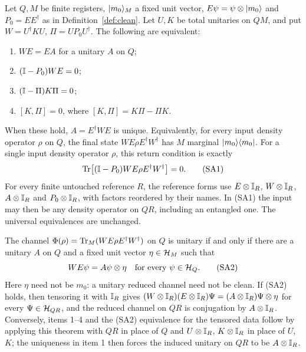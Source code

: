 \begin{theorem}\label{thm:sA-clean}
Let $Q,M$ be finite registers, $\lvert m_0\rangle_M$ a fixed unit vector,
$E\psi=\psi\otimes\lvert m_0\rangle$ and $P_0=EE^\dagger$ as in
Definition~\ref{def:clean}. Let $U,K$ be total unitaries on $QM$, and
put $W=U^\dagger KU$, $\Pi=UP_0U^\dagger$. The following are equivalent:
\begin{enumerate}
 \item $WE=EA$ for a unitary $A$ on $Q$;
 \item $(\mathbb{I}-P_0)WE=0$;
 \item $(\mathbb{I}-\Pi)K\Pi=0$;
 \item $[K,\Pi]=0$, where $[K,\Pi]=K\Pi-\Pi K$.
\end{enumerate}
When these hold, $A=E^\dagger WE$ is unique. Equivalently, for every
input density operator $\rho$ on $Q$, the final state
$WE\rho E^\dagger W^\dagger$ has $M$ marginal $\lvert m_0\rangle\langle m_0\rvert$.
For a single input density operator $\rho$, this return condition is exactly
\[
 \operatorname{Tr}\bigl[(\mathbb{I}-P_0)WE\rho E^\dagger W^\dagger\bigr]=0.       \tag{SA1}
\]
For every finite untouched reference $R$, the reference forms use
$E\otimes\mathbb{I}_R$, $W\otimes\mathbb{I}_R$, $A\otimes\mathbb{I}_R$ and
$P_0\otimes\mathbb{I}_R$, with factors reordered by their names. In (SA1)
the input may then be any density operator on $QR$, including an
entangled one. The universal equivalences are unchanged.

The channel $\Phi(\rho)=\operatorname{Tr}_M(WE\rho E^\dagger W^\dagger)$ on $Q$
is unitary if and only if there are a unitary $A$ on $Q$ and a fixed
unit vector $\eta\in\mathcal{H}_M$ such that
\[
 WE\psi=A\psi\otimes\eta\quad\hbox{for every }\psi\in\mathcal{H}_Q.
                                                               \tag{SA2}
\]
Here $\eta$ need not be $m_0$: a unitary reduced channel need not be clean.
If (SA2) holds, then tensoring it with $\mathbb{I}_R$ gives
$(W\otimes\mathbb{I}_R)(E\otimes\mathbb{I}_R)\Psi=(A\otimes\mathbb{I}_R)\Psi\otimes\eta$ for
every $\Psi\in\mathcal{H}_{QR}$, and the reduced channel on $QR$ is conjugation
by $A\otimes\mathbb{I}_R$. Conversely, items 1–4 and the (SA2) equivalence for
the tensored data follow by applying this theorem with $QR$ in place of
$Q$ and $U\otimes\mathbb{I}_R$, $K\otimes\mathbb{I}_R$ in place of $U$, $K$; the
uniqueness in item 1 then forces the induced unitary on $QR$ to be
$A\otimes\mathbb{I}_R$.
\end{theorem}
